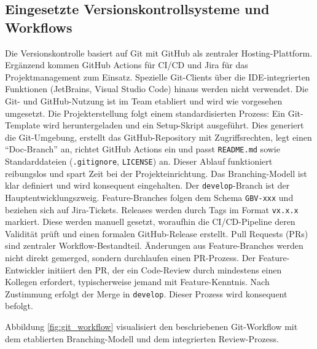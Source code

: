 \documentclass[12pt,oneside]{article}
\begin{document}
    \subsection{Eingesetzte Versionskontrollsysteme und Workflows}
    \label{subsec:vk_systeme}
    Die Versionskontrolle basiert auf Git mit GitHub als zentraler Hosting-Plattform. Ergänzend kommen GitHub Actions für CI/CD und Jira für das Projektmanagement zum Einsatz. Spezielle Git-Clients über die IDE-integrierten Funktionen (JetBrains, Visual Studio Code) hinaus werden nicht verwendet. Die Git- und GitHub-Nutzung ist im Team etabliert und wird wie vorgesehen umgesetzt.
    \newline
    Die Projekterstellung folgt einem standardisierten Prozess: Ein Git-Template wird heruntergeladen und ein Setup-Skript ausgeführt. Dies generiert die Git-Umgebung, erstellt das GitHub-Repository mit Zugriffsrechten, legt einen ``Doc-Branch'' an, richtet GitHub Actions ein und passt \texttt{README.md} sowie Standarddateien (\texttt{.gitignore}, \texttt{LICENSE}) an. Dieser Ablauf funktioniert reibungslos und spart Zeit bei der Projekteinrichtung.
    \newline
    Das Branching-Modell ist klar definiert und wird konsequent eingehalten. Der \texttt{develop}-Branch ist der Hauptentwicklungszweig. Feature-Branches folgen dem Schema \texttt{GBV-xxx} und beziehen sich auf Jira-Tickets. Releases werden durch Tags im Format \texttt{vx.x.x} markiert. Diese werden manuell gesetzt, woraufhin die CI/CD-Pipeline deren Validität prüft und einen formalen GitHub-Release erstellt.
    \newline
    Pull Requests (PRs) sind zentraler Workflow-Bestandteil. Änderungen aus Feature-Branches werden nicht direkt gemerged, sondern durchlaufen einen PR-Prozess. Der Feature-Entwickler initiiert den PR, der ein Code-Review durch mindestens einen Kollegen erfordert, typischerweise jemand mit Feature-Kenntnis. Nach Zustimmung erfolgt der Merge in \texttt{develop}. Dieser Prozess wird konsequent befolgt.

    Abbildung \ref{fig:git_workflow} visualisiert den beschriebenen Git-Workflow mit dem etablierten Branching-Modell und dem integrierten Review-Prozess.
\end{document}
